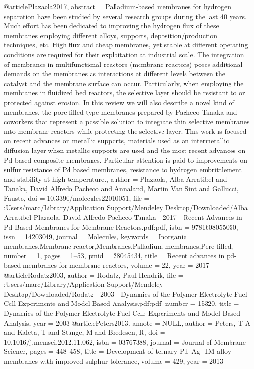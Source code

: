 @article{Plazaola2017,
abstract = {Palladium-based membranes for hydrogen separation have been studied by several research groups during the last 40 years. Much effort has been dedicated to improving the hydrogen flux of these membranes employing different alloys, supports, deposition/production techniques, etc. High flux and cheap membranes, yet stable at different operating conditions are required for their exploitation at industrial scale. The integration of membranes in multifunctional reactors (membrane reactors) poses additional demands on the membranes as interactions at different levels between the catalyst and the membrane surface can occur. Particularly, when employing the membranes in fluidized bed reactors, the selective layer should be resistant to or protected against erosion. In this review we will also describe a novel kind of membranes, the pore-filled type membranes prepared by Pacheco Tanaka and coworkers that represent a possible solution to integrate thin selective membranes into membrane reactors while protecting the selective layer. This work is focused on recent advances on metallic supports, materials used as an intermetallic diffusion layer when metallic supports are used and the most recent advances on Pd-based composite membranes. Particular attention is paid to improvements on sulfur resistance of Pd based membranes, resistance to hydrogen embrittlement and stability at high temperature.},
author = {Plazaola, Alba Arratibel and Tanaka, David Alfredo Pacheco and Annaland, Martin Van Sint and Gallucci, Fausto},
doi = {10.3390/molecules22010051},
file = {:Users/marc/Library/Application Support/Mendeley Desktop/Downloaded/Alba Arratibel Plazaola, David Alfredo Pacheco Tanaka - 2017 - Recent Advances in Pd-Based Membranes for Membrane Reactors.pdf:pdf},
isbn = {9781608055050},
issn = {14203049},
journal = {Molecules},
keywords = {Inorganic membranes,Membrane reactor,Membranes,Palladium membranes,Pore-filled},
number = {1},
pages = {1--53},
pmid = {28045434},
title = {{Recent advances in pd-based membranes for membrane reactors}},
volume = {22},
year = {2017}
}
@article{Rodatz2003,
author = {Rodatz, Paul Hendrik},
file = {:Users/marc/Library/Application Support/Mendeley Desktop/Downloaded/Rodatz - 2003 - Dynamics of the Polymer Electrolyte Fuel Cell Experiments and Model-Based Analysis.pdf:pdf},
number = {15320},
title = {{Dynamics of the Polymer Electrolyte Fuel Cell: Experiments and Model-Based Analysis}},
year = {2003}
}
@article{Peters2013,
annote = {NULL},
author = {Peters, T A and Kaleta, T and Stange, M and Bredesen, R},
doi = {10.1016/j.memsci.2012.11.062},
isbn = {03767388},
journal = {Journal of Membrane Science},
pages = {448--458},
title = {{Development of ternary Pd–Ag–TM alloy membranes with improved sulphur tolerance}},
volume = {429},
year = {2013}
}
